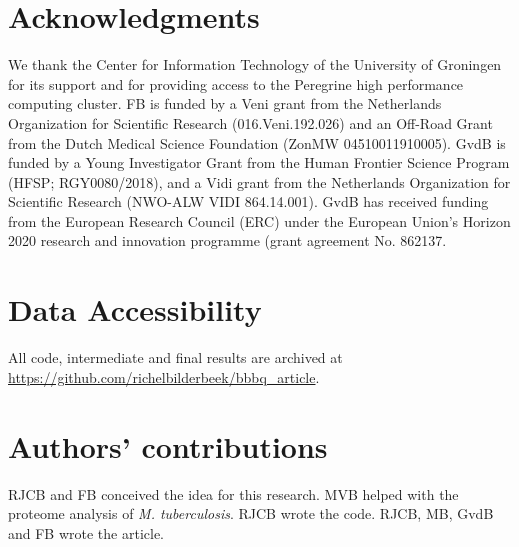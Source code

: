 \section{Acknowledgments}

We thank the Center for Information Technology of the University 
of Groningen for its support and for providing access to the Peregrine 
high performance computing cluster. 
FB is funded by a Veni grant from the Netherlands Organization for Scientific
Research (016.Veni.192.026) and an Off-Road Grant from the Dutch Medical Science Foundation (ZonMW 04510011910005).
GvdB is funded by a Young Investigator Grant from 
the Human Frontier Science Program (HFSP; RGY0080/2018), 
and a Vidi grant from 
the Netherlands Organization for Scientific Research (NWO-ALW VIDI 864.14.001). 
GvdB has received funding from the European Research Council (ERC) 
under the European Union’s Horizon 2020 research and 
innovation programme (grant agreement No. 862137. 

\section{Data Accessibility}

All code, intermediate and final results are archived at 
\url{https://github.com/richelbilderbeek/bbbq_article}.

\section{Authors' contributions}

RJCB and FB conceived the idea for this research. 
MVB helped with the proteome analysis of \emph{M. tuberculosis}.
RJCB wrote the code.
RJCB, MB, GvdB and FB wrote the article.


%


